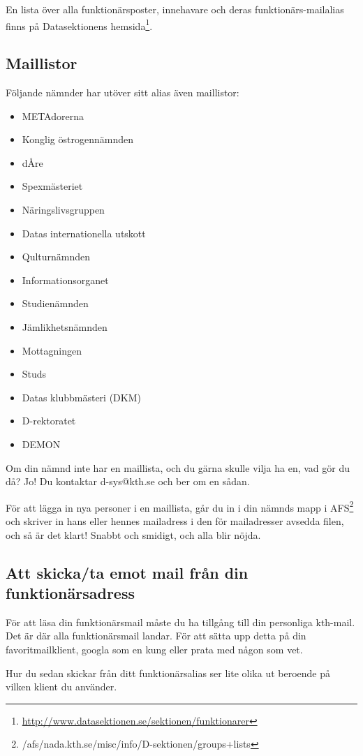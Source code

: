 \documentclass[a4paper,11pt]{article}
\begin{document}
En lista över alla funktionärsposter, innehavare och deras funktionärs-mailalias finns på Datasektionens hemsida\footnote{\url{http://www.datasektionen.se/sektionen/funktionarer}}.

\subsection{Maillistor}
Följande nämnder har utöver sitt alias även maillistor:
\begin{itemize}
\item METAdorerna
\item Konglig östrogennämnden
\item dÅre
\item Spexmästeriet
\item Näringslivsgruppen
\item Datas internationella utskott
\item Qulturnämnden
\item Informationsorganet
\item Studienämnden
\item Jämlikhetsnämnden
\item Mottagningen
\item Studs
\item Datas klubbmästeri (DKM)
\item D-rektoratet
\item DEMON
\end{itemize}

Om din nämnd inte har en maillista, och du gärna skulle vilja ha en, vad gör du då? Jo! Du kontaktar d-sys@kth.se och ber om en sådan.

För att lägga in nya personer i en maillista, går du in i din nämnds mapp i AFS\footnote{/afs/nada.kth.se/misc/info/D-sektionen/groups+lists} och skriver in hans eller hennes mailadress i den för mailadresser avsedda filen, och så är det klart! Snabbt och smidigt, och alla blir nöjda.

\subsection{Att skicka/ta emot mail från din funktionärsadress}
För att läsa din funktionärsmail måste du ha tillgång till din personliga kth-mail. Det är där alla funktionärsmail landar. För att sätta upp detta på din favoritmailklient, googla som en kung eller prata med någon som vet.

Hur du sedan skickar från ditt funktionärsalias ser lite olika ut beroende på vilken klient du använder.
\end{document}
